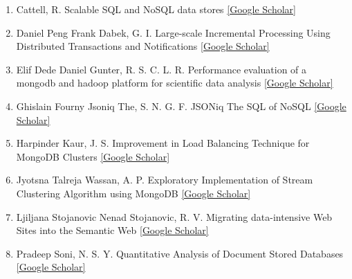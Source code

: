 \documentclass[10pt,twocolumn,twoside]{article}
\begin{document}
\begin{enumerate}
\item Cattell, R.
Scalable SQL and NoSQL data stores \href{https://scholar.google.com/scholar?q=Scalable+SQL+and+NoSQL+data+stores&btnG=&hl=en&as_sdt=0%2C47}{[Google Scholar]}

\item Daniel Peng Frank Dabek, G. I.
Large-scale Incremental Processing Using Distributed Transactions and Notifications
 \href{https://scholar.google.com/scholar?q=Large-scale+Incremental+Processing+Using+Distributed+Transactions+and+Notifications&btnG=&hl=en&as_sdt=0%2C47}{[Google Scholar]}

\item Elif Dede Daniel Gunter, R. S. C. L. R.
Performance evaluation of a mongodb and hadoop platform for scientific data analysis
 \href{https://scholar.google.com/scholar?q=Performance+evaluation+of+a+mongodb+and+hadoop+platform+for+scientific+data+analysis&btnG=&hl=en&as_sdt=0%2C47}{[Google Scholar]}

\item Ghislain Fourny Jsoniq The, S. N. G. F.
JSONiq The SQL of NoSQL
 \href{http://citeseerx.ist.psu.edu/viewdoc/summary?doi=10.1.1.366.3332}{[Google Scholar]}

\item Harpinder Kaur, J. S.
Improvement in Load Balancing Technique for MongoDB Clusters
 \href{https://scholar.google.com/scholar?q=Improvement+in+Load+Balancing+Technique+for+MongoDB+Clusters&btnG=&hl=en&as_sdt=0%2C47}{[Google Scholar]}

\item Jyotsna Talreja Wassan, A. P.
Exploratory Implementation of Stream Clustering Algorithm using MongoDB
 \href{https://scholar.google.com/scholar?q=aExploratory+Implementation+of+Stream+Clustering+Algorithm+using+MongoDB&btnG=&hl=en&as_sdt=0%2C47}{[Google Scholar]}

\item Ljiljana Stojanovic Nenad Stojanovic, R. V.
Migrating data-intensive Web Sites into the Semantic Web
 \href{https://scholar.google.com/scholar?q=Migrating+data-intensive+Web+Sites+into+the+Semantic+Web&btnG=&hl=en&as_sdt=0%2C47}{[Google Scholar]}

\item Pradeep Soni, N. S. Y.
Quantitative Analysis of Document Stored Databases
 \href{https://scholar.google.com/scholar?q=Quantitative+Analysis+of+Document+Stored+Databases&btnG=&hl=en&as_sdt=0%2C47}{[Google Scholar]}


\end{enumerate}
\end{document}
